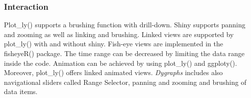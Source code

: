 \subsubsection*{Interaction}
Plot\_ly()\cite{plotly} supports a brushing function with drill-down.
Shiny supports panning and zooming as well as linking and brushing.
Linked views are supported by plot\_ly() with and without shiny. 
Fish-eye views are implemented in the fisheyeR() package. 
The time range can be decreased by limiting the data range inside the code.
Animation can be achieved by using plot\_ly() and ggploty(). Moreover, plot\_ly() offers linked animated views.
\textit{Dygraphs} includes also navigational sliders called Range Selector, panning and zooming and brushing of data items.
\fi

